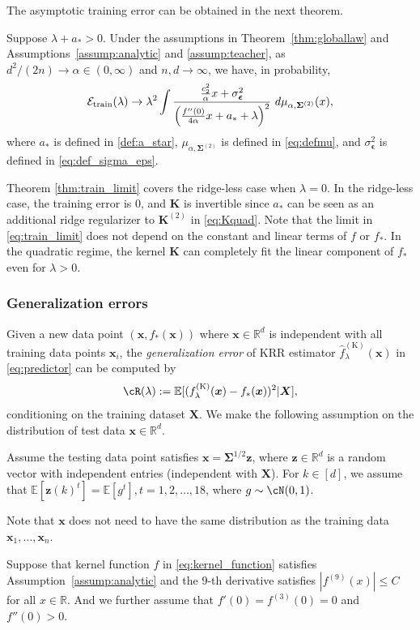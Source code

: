 \documentclass[twoside,11pt]{article}
\newcommand{\bepsilon}{\boldsymbol{\epsilon}}
\newcommand{\R}{\mathbb{R}}
\newcommand{\E}{\mathbb{E}}
\def\bK{{\boldsymbol K}}
\def\bX{{\boldsymbol X}}
\def\bx{{\boldsymbol x}}
\def\bz{{\boldsymbol z}}
\def\bSigma{{\boldsymbol \Sigma}}
\def\cE{{\mathcal E}}
\def\K{{\mathbb K}}
\def\K{{\mathbb K}}
\renewcommand{\bK}{\boldsymbol{K}}
\renewcommand{\K}{\text{K}}
\newcommand{\1}{\mathbf{1}}
\begin{document}
The asymptotic training error can be obtained in the next theorem. 



\begin{theorem}\label{thm:train_limit}
Suppose $\lambda+a_*> 0$. Under the assumptions in Theorem~\ref{thm:globallaw} and Assumptions~\ref{assump:analytic} and \ref{assump:teacher}, as $d^2/(2n)\to \alpha\in (0,\infty)$ and $n,d\to \infty$, we have, in probability,
    \begin{align}\label{eq:train_limit}
    \cE_{\textnormal{train}}(\lambda)\to \lambda^2\int \frac{\frac{c_2^2}{\alpha} x+\sigma_{\bepsilon}^2}{\left(\frac{f''(0)}{4\alpha}x+a_*+\lambda\right)^2}~d\mu_{\alpha,\bSigma^{(2)}}(x),
    \end{align}
 where $a_*$ is defined in \eqref{def:a_star},
  $\mu_{\alpha,\bSigma^{(2)}}$ is  defined in \eqref{eq:defmu}, and $\sigma_{\bepsilon}^2$ is defined in \eqref{eq:def_sigma_eps}.
\end{theorem}


Theorem \ref{thm:train_limit} covers the ridge-less case when $\lambda=0$. In the ridge-less case, the training error is $0$, and $\bK$ is invertible since $a_*$ can be seen as an additional ridge regularizer to $\bK^{(2)}$ in \eqref{eq:Kquad}. Note that the limit in \eqref{eq:train_limit} does not depend on the constant and linear terms of $f$ or $f_*$. In the quadratic regime, the kernel $\bK$ can completely fit the linear component of $f_*$ even for $\lambda>0$.

\subsubsection{Generalization errors}

Given a new data point $(\bx,f_*(\bx))$ where $\bx\in\R^d$ is independent with all training data points $\bx_i$,  the \textit{generalization error} of KRR estimator $ \hat f^{(\K)}_\lambda(\bx)$ in \eqref{eq:predictor} can be computed by
\begin{align}
    \cR(\lambda):=\E[(f^{(\K)}_\lambda(\bx)-f_*(\bx))^2|\bX],\label{eq:test_K}
\end{align}
conditioning on the training dataset $\bX$.  We make the following assumption on the distribution of test data $\bx\in\R^d$.  
\begin{assumption}\label{assumption: testdata}
    Assume the testing data point satisfies $\bx=\bSigma^{1/2}\bz$,  where $\bz\in\R^d$ is a random vector with independent entries (independent with $\bX$). For  $k\in [d]$, we assume that
$\mathbb E[\bz(k)^{t}]=\mathbb E[g^t], t=1,2,\dots, 18$, where  $g\sim \cN(0,1)$. 
\end{assumption}
Note that $\bx$ does not need to have the same distribution as the training data $\bx_1,\dots,\bx_n$.  
\begin{assumption}\label{assumption:C8}
 Suppose that kernel function $f$ in \eqref{eq:kernel_function} satisfies Assumption~\ref{assump:analytic} and the 9-th derivative satisfies $|f^{(9)}(x)|\leq C$ for all $x\in \mathbb R$. And we further assume that $f'(0)=f^{(3)}(0)=0$ and $f''(0)>0$.
\end{assumption}
\end{document}
